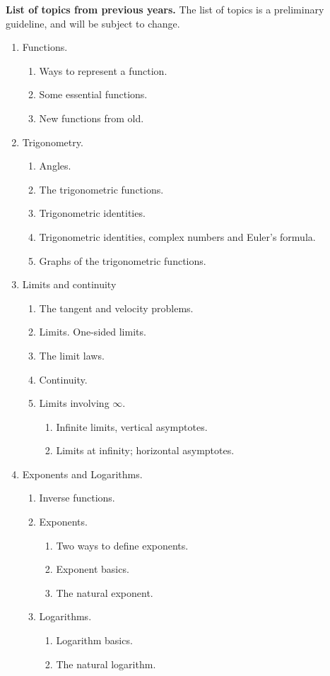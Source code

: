 \documentclass{article}
\begin{document}
\medskip
\noindent \textbf{List of topics from previous years.} The list of topics is a preliminary guideline, and will be subject to change.
\begin{enumerate}[label*=\arabic*.]
\item Functions.
\begin{enumerate}[label*=\arabic*.]
\item Ways to represent a function.
\item Some essential functions.
\item New functions from old.

\end{enumerate}
\item Trigonometry.
\begin{enumerate}[label*=\arabic*.]
\item Angles.
\item The trigonometric functions.
\item Trigonometric identities.
\item Trigonometric identities, complex numbers and Euler's formula.
\item Graphs of the trigonometric functions.
\end{enumerate}
\item Limits and continuity
\begin{enumerate}[label*=\arabic*.]
\item The tangent and velocity problems.
\item Limits. One-sided limits. 
\item The limit laws.
\item Continuity.
\item Limits involving $\infty$. 
\begin{enumerate}[label*=\arabic*.]
\item Infinite limits, vertical asymptotes.
\item Limits at infinity; horizontal asymptotes.
\end{enumerate}
\end{enumerate}
\item Exponents and Logarithms.
\begin{enumerate}[label*=\arabic*.]
\item Inverse functions.
\item Exponents.
\begin{enumerate}[label*=\arabic*.]
\item Two ways to define exponents.
\item Exponent basics.
\item The natural exponent.
\end{enumerate}
\item Logarithms.
\begin{enumerate}[label*=\arabic*.]
\item Logarithm basics. 
\item The natural logarithm.
\end{enumerate}
\end{enumerate}


\end{enumerate}
\end{document}
